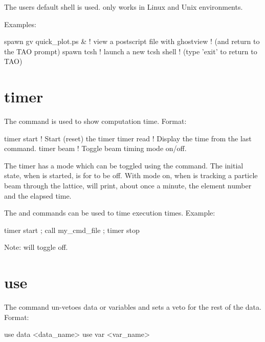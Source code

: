{{{\vskip 0.2in

The users default shell is used.  only works in Linux and
Unix environments.

Examples:
\begin{example}
  spawn gv quick_plot.ps &      ! view a postscript file with ghostview
                                ! (and return to the TAO prompt)
  spawn tcsh                    ! launch a new tcsh shell 
                                ! (type 'exit' to return to TAO)
\end{example}

\section{timer}
\label{s:timer}

The  command is used to show computation time. Format:
\begin{example}
  timer start      ! Start (reset) the timer
  timer read       ! Display the time from the last  command.    
  timer beam       ! Toggle beam timing mode on/off.
\end{example}
The timer has a  mode which can be toggled using the
 command. The initial state, when \tao is started, is for
 to be off. With  mode on, when \tao
is tracking a particle beam through the lattice, \tao will print,
about once a minute, the element number and the elapsed time.

The  and  commands can
be used to time execution times. Example:
\begin{example}
  timer start ; call my_cmd_file ; timer stop
\end{example}

Note:  will toggle  off.

\section{use}
\label{s:use}

The  command un-vetoes data or variables and sets a veto for
the rest of the data. Format:
\begin{example}
  use data  <data_name>
  use var <var_name>
\end{example}

}}}
